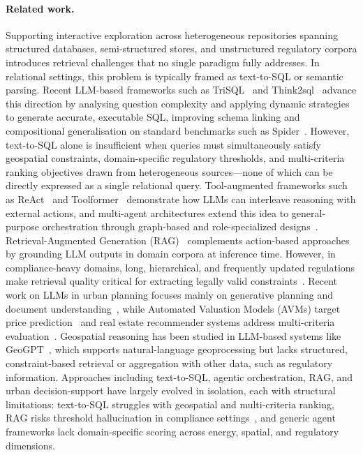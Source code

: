 \documentclass[runningheads,orivec]{llncs}
\begin{document}
\paragraph{Related work.}
Supporting interactive exploration across heterogeneous repositories spanning structured databases, semi-structured stores, and unstructured regulatory corpora introduces retrieval challenges that no single paradigm fully addresses. In relational settings, this problem is typically framed as text-to-SQL or semantic parsing.
Recent LLM-based frameworks such as TriSQL~\cite{Su2026Text2SQL} and Think2sql~\cite{papicchio2025think2sql} advance this direction by analysing question complexity and applying dynamic strategies to generate accurate, executable SQL, improving schema linking and compositional generalisation on standard benchmarks such as Spider~\cite{yu_spider_2018}.
However, text-to-SQL alone is insufficient when queries must simultaneously satisfy geospatial constraints, domain-specific regulatory thresholds, and multi-criteria ranking objectives drawn from heterogeneous sources—none of which can be directly expressed as a single relational query.
Tool-augmented frameworks such as ReAct~\cite{yao2022react} and Toolformer~\cite{schick_toolformer_2023} demonstrate how LLMs can interleave reasoning with external actions, and multi-agent architectures extend this idea to general-purpose orchestration through graph-based and role-specialized designs~\cite{wang2024llmas}.
Retrieval-Augmented Generation (RAG)~\cite{lewis_rag_2020} complements action-based approaches by grounding LLM outputs in domain corpora at inference time. However, in compliance-heavy domains, long, hierarchical, and frequently updated regulations make retrieval quality critical for extracting legally valid constraints~\cite{reuter-etal-2025-towards}.
Recent work on LLMs in urban planning focuses mainly on generative planning and document understanding~\cite{zhou2024llm}, while Automated Valuation Models (AVMs) target price prediction~\cite{JAFARY2024105115} and real estate recommender systems address multi-criteria evaluation~\cite{ginevicius2011recommender,gharahighehi2021recommender,de2025recommender}.
Geospatial reasoning has been studied in LLM-based systems like GeoGPT~\cite{zhang_geogpt_2024}, which supports natural-language geoprocessing but lacks structured, constraint-based retrieval or aggregation with other data, such as regulatory information.
Approaches including text-to-SQL, agentic orchestration, RAG, and urban decision-support have largely evolved in isolation, each with structural limitations: text-to-SQL struggles with geospatial and multi-criteria ranking, RAG risks threshold hallucination in compliance settings~\cite{reuter-etal-2025-towards}, and generic agent frameworks lack domain-specific scoring across energy, spatial, and regulatory dimensions.
\end{document}
